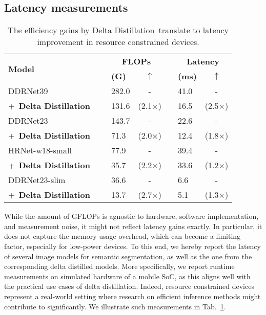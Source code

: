 \documentclass[runningheads]{llncs}
\newcommand{\deltadist}{Delta Distillation~}
\begin{document}
\subsection{Latency measurements}
\begin{table}[t]
\caption{The efficiency gains by \deltadist translate to latency improvement in resource constrained devices.}
\begin{center}
\begin{tabular}{lm{.5cm}m{1cm}cm{.5cm}m{1cm}c}
\toprule
\multirow{2}{*}{\textbf{Model}} && \multicolumn{2}{c}{\textbf{FLOPs}} && \multicolumn{2}{c}{\textbf{Latency}}\\
&& \textbf{(G)} & $\uparrow$ && \textbf{(ms)} & $\uparrow$\\
\midrule
\rowcolor{Gray}
DDRNet39 && 282.0 & - && 41.0 & -\\
\quad+~\textbf{\deltadist} && 131.6 & (2.1$\times$) && 16.5 & (2.5$\times$)\\ 
\rowcolor{Gray}
DDRNet23 && 143.7 & - && 22.6 & -\\
\quad+~\textbf{\deltadist} && 71.3 & (2.0$\times$) && 12.4 & (1.8$\times$)\\ 
\rowcolor{Gray}
HRNet-w18-small && 77.9 & - && 39.4 & -\\
\quad+~\textbf{\deltadist} && 35.7 & (2.2$\times$) && 33.6 & (1.2$\times$)\\ 
\rowcolor{Gray}
DDRNet23-slim && 36.6 & - && 6.6 & -\\
\quad+~\textbf{\deltadist} && 13.7 & (2.7$\times$) && 5.1 & (1.3$\times$)\\ 
\bottomrule
\end{tabular}\end{center}
\label{tab:latency} 
\end{table} While the amount of GFLOPs is agnostic to hardware, software implementation, and measurement noise, it might not reflect latency gains exactly. 
In particular, it does not capture the memory usage overhead, which can become a limiting factor, especially for low-power devices.
To this end, we hereby report the latency of several image models for semantic segmentation, as well as the one from the corresponding delta distilled models.
More specifically, we report runtime measurements on simulated hardware of a mobile SoC, as this aligns well with the practical use cases of delta distillation. 
Indeed, resource constrained devices represent a real-world setting where research on efficient inference methods might contribute to significantly.
We illustrate such measurements in Tab.~\ref{tab:latency}.
\end{document}
